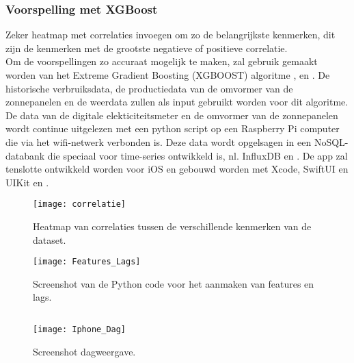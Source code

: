 \subsubsection{Voorspelling met XGBoost}

Zeker heatmap met correlaties invoegen om zo de belangrijkste kenmerken, dit zijn de kenmerken met de grootste negatieve of positieve correlatie. \\

Om de voorspellingen zo accuraat mogelijk te maken, zal gebruik gemaakt worden van het Extreme Gradient Boosting (XGBOOST) algoritme \autocite{Ledmaoui2023}, \autocite{Wang2022} en \autocite{BarreraAnimas2022}. De historische verbruiksdata, de productiedata van de omvormer van de zonnepanelen en de weerdata zullen als input gebruikt worden voor dit algoritme. De data van de digitale elekticiteitsmeter en de omvormer van de zonnepanelen wordt continue uitgelezen met een python script op een Raspberry Pi computer die via het wifi-netwerk verbonden is. Deze data wordt opgelsagen in een NoSQL-databank die speciaal voor time-series ontwikkeld is, nl. InfluxDB \autocite{Balis2017} en  \autocite{Struckov2019}. De app zal tenslotte ontwikkeld worden voor iOS en gebouwd worden met Xcode, SwiftUI en UIKit \autocite{Allardice} en \autocite{Firtman2022}.

\begin{figure}[h!]
    \centering\texttt{[image: correlatie]}
    \caption{\label{fig:correlatie}Heatmap van correlaties tussen de verschillende kenmerken van de dataset.}
\end{figure} 

\begin{figure}[h!]
    \centering\texttt{[image: Features\_Lags]}
    \caption{\label{fig:Features_Lags}Screenshot van de Python code voor het aanmaken van features en lags.}
\end{figure} 

\subsection{}%
\label{sec:Weergave uitgelezen data en voorspelling met een iOS app}

\begin{figure}[h!]
    \centering\texttt{[image: Iphone\_Dag]}
    \caption{\label{fig:Iphone_Dag}Screenshot dagweergave.}
\end{figure} 


